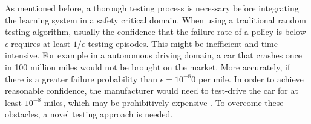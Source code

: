 As mentioned before, a thorough testing process is necessary before integrating the learning system in a safety critical domain. When using a traditional random testing algorithm, usually the confidence that the failure rate of a policy is below $\epsilon$ requires at least $1/\epsilon$ testing episodes. This might be inefficient and time-intensive. For example in a autonomous driving domain, a car that crashes once in 100 million miles would not be brought on the market. More accurately, if there is a greater failure probability than $\epsilon = 10^{-8}0$ per mile. In order to achieve reasonable confidence, the manufacturer would need to test-drive the car for at least $10^{-8}$ miles, which may be prohibitively expensive \cite{uesato18}. To overcome these obstacles, a novel testing approach is needed.